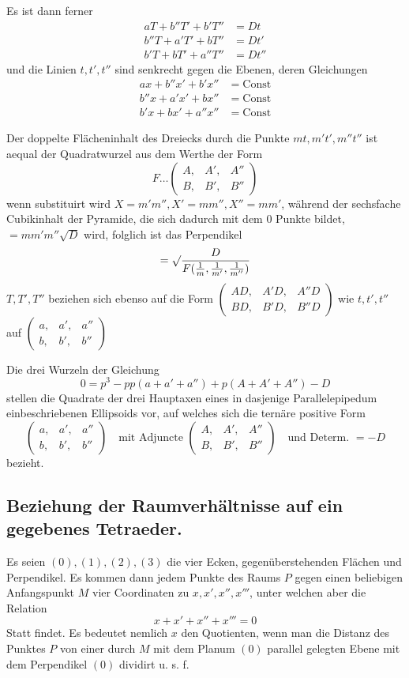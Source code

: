 Es ist dann ferner
\[
\begin{aligned}
aT+b''T'+b'T''&=Dt\\
b''T+a'T'+bT''&=Dt'\\
b'T+bT'+a''T''&=Dt''
\end{aligned}
\]
und die Linien $t,t',t''$ sind senkrecht gegen die Ebenen, deren Gleichungen
\[
\begin{aligned}
ax+b''x'+b'x''&=\mathrm{Const}\\
b''x+a'x'+bx''&=\mathrm{Const}\\
b'x+bx'+a''x''&=\mathrm{Const}
\end{aligned}
\]

Der doppelte Flächeninhalt des Dreiecks durch die Punkte $mt,m't',m''t''$ ist aequal der Quadratwurzel aus dem Werthe der Form
\[
F\ldots\left(\begin{smallmatrix}A,&A',&A''\\B,&B',&B''\end{smallmatrix}\right)
\]
wenn substituirt wird $X=m'm'',X'=mm'',X''=mm'$, während der sechsfache Cubikinhalt der Pyramide, die sich dadurch mit dem $0$ Punkte bildet, $=mm'm''\surd D$ wird, folglich ist das Perpendikel
\[
=\surd\frac{D}{F(\frac1m,\frac1{m'},\frac1{m''})}
\]
$T,T',T''$ beziehen sich ebenso auf die Form $\left(\begin{smallmatrix}AD,&A'D,&A''D\\BD,&B'D,&B''D\end{smallmatrix}\right)$ wie $t,t',t''$ auf $\left(\begin{smallmatrix}a,&a',&a''\\b,&b',&b''\end{smallmatrix}\right)$

Die drei Wurzeln der Gleichung
\[
0=p^3-pp(a+a'+a'')+p(A+A'+A'')-D
\]
stellen die Quadrate der drei Hauptaxen eines in dasjenige Parallelepipedum einbeschriebenen Ellipsoids vor, auf welches sich die ternäre positive Form
\[
\left(\begin{smallmatrix}a,&a',&a''\\b,&b',&b''\end{smallmatrix}\right)
\quad\text{mit Adjuncte }\left(\begin{smallmatrix}A,&A',&A''\\B,&B',&B''\end{smallmatrix}\right)
\quad\text{und Determ. }=-D
\]
bezieht.

\subsection*{Beziehung der Raumverhältnisse auf ein gegebenes Tetraeder.}
Es seien $(0),(1),(2),(3)$ die vier Ecken, gegenüberstehenden Flächen und Perpendikel. Es kommen dann jedem Punkte des Raums $P$ gegen einen beliebigen Anfangspunkt $M$ vier Coordinaten zu $x,x',x'',x'''$, unter welchen aber die Relation
\[
x+x'+x''+x'''=0
\]
Statt findet. Es bedeutet nemlich $x$ den Quotienten, wenn man die Distanz des
Punktes $P$ von einer durch $M$ mit dem Planum $(0)$ parallel gelegten Ebene mit dem Perpendikel $(0)$ dividirt u. s. f.

